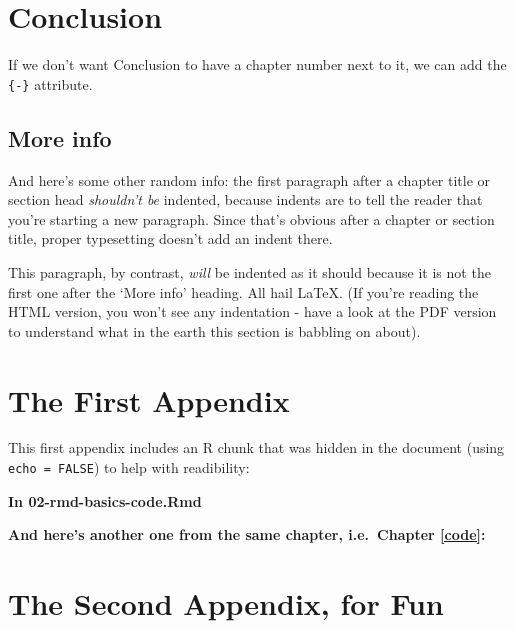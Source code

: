 \documentclass[a4paper, nobind]{templates/ociamthesis}
\newcommand*{\bibtitle}{References}
\begin{document}
\hypertarget{conclusion-1}{%
\chapter*{Conclusion}\label{conclusion-1}}

If we don't want Conclusion to have a chapter number next to it, we can add the \texttt{\{-\}} attribute.

\hypertarget{more-info}{%
\section*{More info}\label{more-info}}

And here's some other random info:
the first paragraph after a chapter title or section head \emph{shouldn't be} indented, because indents are to tell the reader that you're starting a new paragraph.
Since that's obvious after a chapter or section title, proper typesetting doesn't add an indent there.

This paragraph, by contrast, \emph{will} be indented as it should because it is not the first one after the `More info' heading.
All hail LaTeX. (If you're reading the HTML version, you won't see any indentation - have a look at the PDF version to understand what in the earth this section is babbling on about).

\startappendices

\hypertarget{the-first-appendix}{%
\chapter{The First Appendix}\label{the-first-appendix}}

This first appendix includes an R chunk that was hidden in the document (using \texttt{echo\ =\ FALSE}) to help with readibility:

\textbf{In 02-rmd-basics-code.Rmd}

\textbf{And here's another one from the same chapter, i.e.~Chapter \ref{code}:}

\hypertarget{the-second-appendix-for-fun}{%
\chapter{The Second Appendix, for Fun}\label{the-second-appendix-for-fun}}




\setlength{\baselineskip}{0pt} %

{\renewcommand*\MakeUppercase[1]{#1}%
\printbibliography[heading=bibintoc,title={\bibtitle}]}
\end{document}
